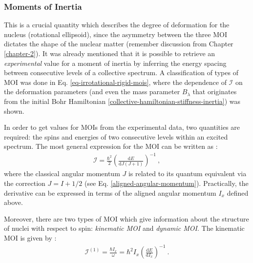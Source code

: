 \subsubsection*{Moments of Inertia}

This is a crucial quantity which describes the degree of deformation for the nucleus (rotational ellipsoid), since the asymmetry between the three MOI dictates the shape of the nuclear matter (remember discussion from Chapter \ref{chapter-2}). It was already mentioned that it is possible to retrieve an \emph{experimental} value for a moment of inertia by inferring the energy spacing between consecutive levels of a collective spectrum. A classification of types of MOI was done in Eq. \ref{eq-irrotational-rigid-mois}, where the dependence of $\mathcal{I}$ on the deformation parameters (and even the mass parameter $B_\lambda$ that originates from the initial Bohr Hamiltonian \ref{collective-hamiltonian-stiffness-inertia}) was shown.

In order to get values for MOIs from the experimental data, two quantities are required: the spins and energies of two consecutive levels within an excited spectrum. The most general expression for the MOI can be written as \cite{ahmad2021backbending}:
\begin{align}
    \mathcal{I}=\frac{\hbar^2}{2}\left(\frac{\text{d}E}{\text{d}J(J+1)}\right)^{-1}\ ,
\end{align}
where the classical angular momentum $J$ is related to its quantum equivalent via the correction $J=I+1/2$ (see Eq. \ref{aligned-angular-momentum}). Practically, the derivative can be expressed in terms of the aligned angular momentum $I_x$ defined above.

Moreover, there are two types of MOI which give information about the structure of nuclei with respect to spin: \emph{kinematic MOI} and \emph{dynamic MOI}. The kinematic MOI is given by \cite{wu1992relation}:
\begin{align}
    \mathcal{I}^{(1)}=\frac{\hbar I_x}{\omega}=\hbar^2 I_x\left(\frac{\text{d}E}{\text{d}I_x}\right)^{-1}\ .
    \label{kinematic-moi-general}
\end{align}

